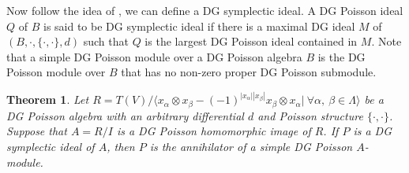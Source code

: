 \documentclass[a4paper,10pt]{amsart}
\newtheorem{theorem}{Theorem}[section]
\theoremstyle{definition}
\theoremstyle{remark}
\numberwithin{equation}{section}
\begin{document}
Now follow the idea of \cite{OPS}, we can define a DG symplectic
ideal. A DG Poisson ideal $Q$ of $B$ is said to be DG symplectic
ideal if there is a maximal DG ideal $M$ of $(B, \cdot, \{\cdot, \cdot\}, d)$
such that $Q$ is the largest DG Poisson ideal contained in $M$. Note
that a simple DG Poisson module over a DG Poisson algebra $B$ is the
DG Poisson module over $B$ that has no non-zero proper DG Poisson
submodule.

\begin{theorem}
Let $R=T(V)/\langle x_{\alpha}\otimes
x_{\beta}-(-1)^{|x_{\alpha}||x_{\beta}|}x_{\beta}\otimes x_{\alpha}|
~\forall \alpha, ~\beta \in\Lambda \rangle$ be a DG Poisson algebra
with an arbitrary differential $d$ and Poisson structure $\{\cdot, \cdot\}$.
Suppose that $A=R/I$ is a DG Poisson homomorphic image of $R$. If $P$ is a DG symplectic ideal of $A$, then $P$ is the
annihilator of a simple DG Poisson $A$-module.
\end{theorem}
\end{document}
